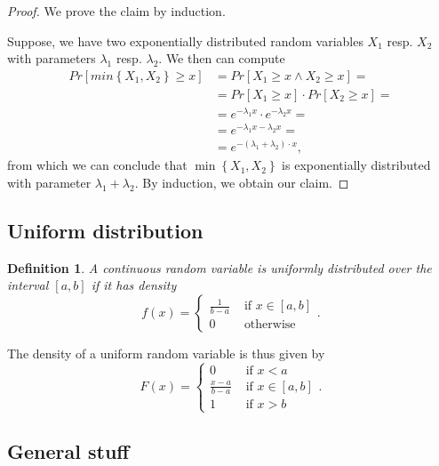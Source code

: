 \documentclass[letter]{report}
\newtheorem{definition}{Definition}[chapter]
\newcommand{\p}[1]{Pr\left[#1\right]}
\begin{document}
\begin{proof}
  We prove the claim by induction. 

  Suppose, we have two exponentially distributed random variables $X_1$ resp. $X_2$ with parameters $\lambda_1$ resp. $\lambda_2$. We then can compute
  \begin{align*}
    \p{min\left\{ X_1,X_2 \right\} \geq x} & = \p{X_1 \geq x \wedge X_2 \geq x} = \\ 
    & = \p{X_1 \geq x}\cdot\p{X_2 \geq x} = \\
    & = e^{-\lambda_1 x} \cdot e^{-\lambda_2 x} = \\
    & = e^{-\lambda_1 x - \lambda_2 x} = \\
    & = e^{-\left( \lambda_1+\lambda_2 \right) \cdot x},
  \end{align*}
  from which we can conclude that $\min\left\{ X_1,X_2 \right\}$ is exponentially distributed with parameter $\lambda_1 + \lambda_2$. By induction, we obtain our claim.
\end{proof}

\subsection{Uniform distribution}
\label{sec:uniform-distribution}

\begin{definition}
  A continuous random variable is \emph{uniformly distributed} over the interval $\left[ a,b \right]$ if it has density
  \begin{equation*}
    f(x) =
    \begin{cases}
      \frac{1}{b-a} & \text{ if } x\in\left[ a,b \right] \\
      0 & \text{ otherwise}
    \end{cases}.
  \end{equation*}
\end{definition}

The density of a uniform random variable is thus given by
\begin{equation*}
  F(x) = \begin{cases}
    0 & \text{ if } x<a \\
    \frac{x-a}{b-a} & \text{ if } x\in\left[ a,b \right] \\
    1 & \text{ if } x>b
  \end{cases}.
\end{equation*}


\subsection{General stuff}
\label{sec:probability-misc}
\end{document}
